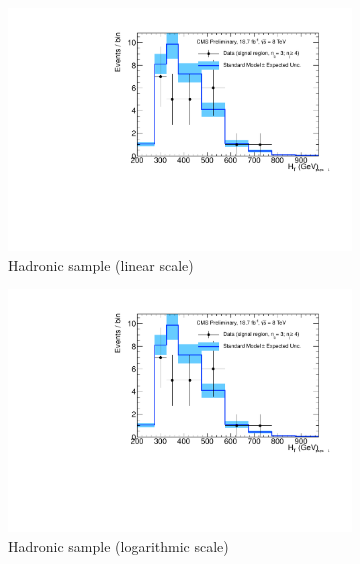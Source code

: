 \clearpage
\begin{figure}[h!]
  \centering
  \begin{subfigure}[b]{0.48\textwidth}
    \includegraphics[width=\textwidth,page=1]
    {Figs/results/v0/blueBand/bestFit_2012dev_RQcdZero_fZinvAll_3b_ge4j-1h_smOnly}
    \caption{Hadronic sample (linear scale)}
  \end{subfigure}
  \begin{subfigure}[b]{0.48\textwidth}
    \includegraphics[width=\textwidth,page=2]
    {Figs/results/v0/blueBand/bestFit_2012dev_RQcdZero_fZinvAll_3b_ge4j-1h_smOnly}
    \caption{Hadronic sample (logarithmic scale)}
  \end{subfigure}
  \begin{subfigure}[b]{0.48\textwidth}

\end{subfigure}
\end{figure}
